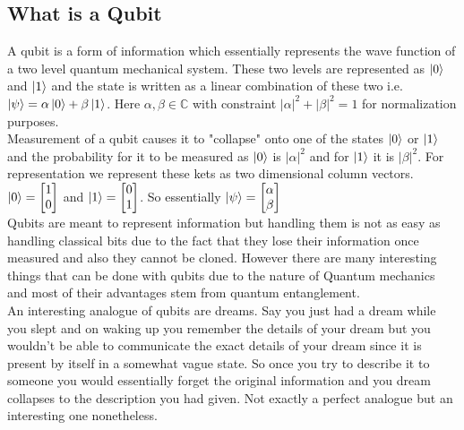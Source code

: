 \documentclass{report}
\begin{document}
\subsection{What is a Qubit}
A qubit is a form of information which essentially represents the wave function of a two level quantum mechanical system. These two levels are represented as $\ket{0}$ and $\ket{1}$ and the state is written as a linear combination of these two i.e. $\ket{\psi} = \alpha\ket{0} + \beta\ket{1}$. Here $\alpha,\beta\in\mathbb{C}$ with constraint $|\alpha|^2 + |\beta|^2 = 1$ for normalization purposes.\\
Measurement of a qubit causes it to "collapse" onto one of the states $\ket{0}$ or $\ket{1}$ and the probability for it to be measured as $\ket{0}$ is $|\alpha|^2$ and for $\ket{1}$ it is $|\beta|^2$. For representation we represent these kets as two dimensional column vectors.\\
$\ket{0} = \begin{bmatrix} 1\\0\end{bmatrix}$ and $\ket{1} = \begin{bmatrix}0\\1\end{bmatrix}$. So essentially $\ket{\psi} = \begin{bmatrix} \alpha\\\beta\end{bmatrix}$\\
Qubits are meant to represent information but handling them is not as easy as handling classical bits due to the fact that they lose their information once measured and also they cannot be cloned. However there are many interesting things that can be done with qubits due to the nature of Quantum mechanics and most of their advantages stem from quantum entanglement.\\
An interesting analogue of qubits are dreams. Say you just had a dream while you slept and on waking up you remember the details of your dream but you wouldn't be able to communicate the exact details of your dream since it is present by itself in a somewhat vague state. So once you try to describe it to someone you would essentially forget the original information and you dream collapses to the description you had given. Not exactly a perfect analogue but an interesting one nonetheless.
\end{document}

